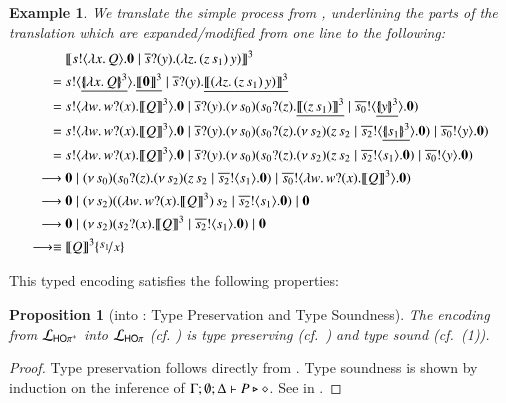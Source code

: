 \documentclass[preprint,11pt]{elsarticle}
\newtheorem{proposition}{Proposition}[section]
\newtheorem{example}{Example}[section]
\begin{document}
{\begin{example}
We translate the simple process from , underlining the parts of the translation which are expanded/modified from one line to the following:
\begin{align*}
& \map{\bout{s}{\abs{x}{Q}}\inact  \Par \binp{\dual{s}}{y}(\appl{\abs{z}{(\appl{z}{s_1}})}{y})}^{3} 
\\
=~ &
\bout{s}{\underline{\auxmap{\abs{x}{Q}}{3}}}\underline{\map{\inact}^{3}}  \Par \binp{\dual{s}}{y}\underline{\map{(\appl{\abs{z}{(\appl{z}{s_1}})}{y})}^{3}} 
\\
=~ & \bout{s}{\abs{w}{\binp{w}{x} \pmap{Q}{3}}} \inact   \Par \binp{\dual{s}}{y}\newsp{s_0}{\binp{s_0}{z} \underline{\pmap{(\appl{z}{s_1})}{3}} \Par  \bout{\dual{s_0}}{\underline{\auxmap{y}{3}}} \inact}
\\
=~ & \bout{s}{\abs{w}{\binp{w}{x} \pmap{Q}{3}}}\inact  \Par \binp{\dual{s}}{y}\newsp{s_0}{\binp{s_0}{z} \newsp{s_2}{\appl{z}{s_2} \Par \bout{\dual{s_2}}{\underline{\auxmap{s_1}{3}}} \inact} \Par  \bout{\dual{s_0}}{y} \inact}
\\
=~ & \bout{s}{\abs{w}{\binp{w}{x} \pmap{Q}{3}}}\inact  \Par \binp{\dual{s}}{y}\newsp{s_0}{\binp{s_0}{z} \newsp{s_2}{\appl{z}{s_2} \Par \bout{\dual{s_2}}{s_1} \inact} \Par  \bout{\dual{s_0}}{y} \inact}
\\
\red~ & \inact  \Par \newsp{s_0}{\binp{s_0}{z} \newsp{s_2}{\appl{z}{s_2} \Par \bout{\dual{s_2}}{s_1} \inact} \Par  \bout{\dual{s_0}}{\abs{w}{\binp{w}{x} \pmap{Q}{3}}} \inact}
\\
\red~ & \inact  \Par \newsp{s_2}{\appl{(\abs{w}{\binp{w}{x} \pmap{Q}{3}})}{s_2} \Par \bout{\dual{s_2}}{s_1} \inact} \Par \inact
\\
\red~ & \inact  \Par \newsp{s_2}{\binp{s_2}{x} \pmap{Q}{3} \Par \bout{\dual{s_2}}{s_1} \inact} \Par \inact
\\ 
\red\scong~ & \pmap{Q}{3}\subst{s_1}{x}
\end{align*}
\end{example}
This typed encoding satisfies the following properties:
{
\begin{proposition}[\HOpp into \HOp: Type Preservation and Type Soundness]
\label{prop:typepres_HOpp_to_HOp}
The encoding from $\mathcal{L}_{\mathsf{HO\pi^{+}}}$ into $\mathcal{L}_{\mathsf{HO}\pi}$ (cf. )
is type preserving (cf.~) and type sound (cf.~(1)).
\end{proposition}}

\begin{proof}
Type preservation follows directly from .
Type soundness is shown by  induction on the inference of 
	$\Gamma; \emptyset; \Delta \vdash P \triangleright \diamond$.
	See  in .
	\end{proof}
	
}
\end{document}
